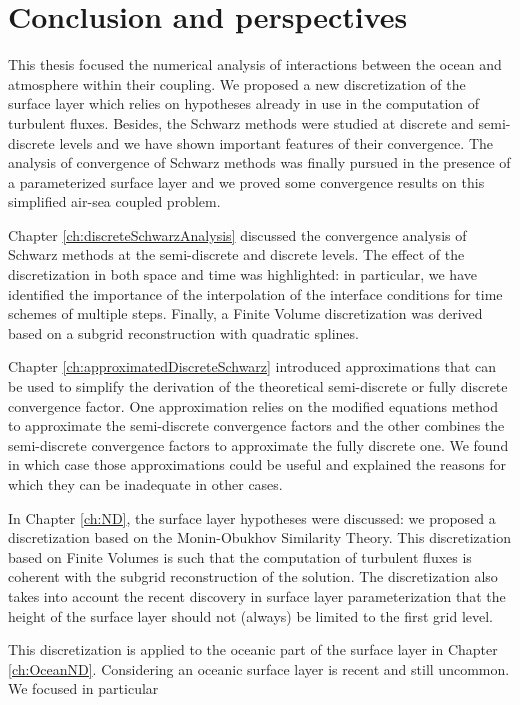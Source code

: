 \chapter*{Conclusion and perspectives}
\label{ch:conclusion}
This thesis focused the numerical analysis of interactions between
the ocean and atmosphere within their coupling. We proposed a
new discretization of the surface layer which relies on
hypotheses already in use in the computation of turbulent fluxes.
Besides, the Schwarz methods were studied at discrete and
semi-discrete levels and we have shown important features of their
convergence. The analysis of convergence of Schwarz methods
was finally pursued
in the presence of a parameterized surface layer and we
proved some convergence results on this simplified air-sea coupled
problem.
\par
Chapter \ref{ch:discreteSchwarzAnalysis} discussed the convergence
analysis of Schwarz methods at the semi-discrete and discrete
levels. The effect of the discretization in both
space and time was highlighted: in particular, we have identified
the importance of the interpolation of the interface conditions
for time schemes of multiple steps.
Finally, a Finite Volume discretization was derived based
on a subgrid reconstruction with quadratic splines.
\par
Chapter \ref{ch:approximatedDiscreteSchwarz} introduced
approximations that can be used to simplify the derivation
of the theoretical semi-discrete or fully discrete convergence factor.
One approximation relies on the modified equations method to
approximate the semi-discrete convergence factors and
the other combines the semi-discrete convergence factors
to approximate the fully discrete one.
We found in which case those approximations could be useful and
explained the reasons for which they can be inadequate in other
cases.
\par
In Chapter \ref{ch:ND}, the surface layer hypotheses were discussed:
we proposed a discretization based on the Monin-Obukhov Similarity
Theory. This discretization based on Finite Volumes
is such that the computation of turbulent fluxes is coherent
with the subgrid reconstruction of the solution.
The discretization also takes into account the recent discovery
in surface layer parameterization that the height of the
surface layer should not (always) be limited to the first grid level.
\par
This discretization is applied to the oceanic part of the surface
layer in Chapter \ref{ch:OceanND}. Considering an oceanic
surface layer is recent and still uncommon. We focused in particular
